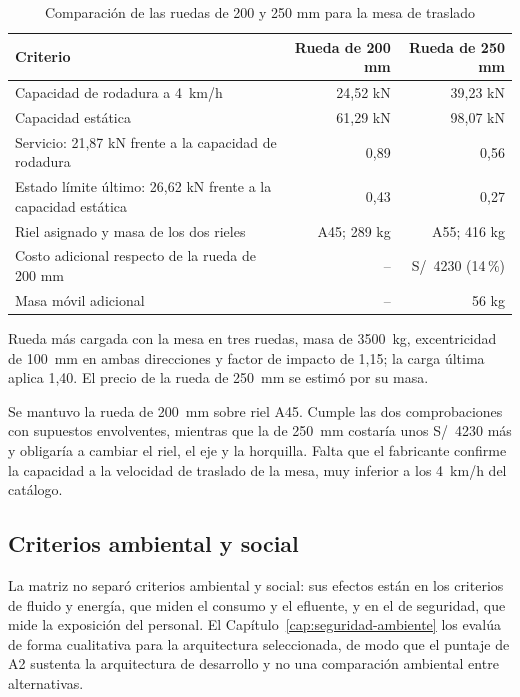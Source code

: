 \begin{table}[htbp]
\centering\small\singlespacing
\caption{Comparación de las ruedas de 200 y 250 mm para la mesa de traslado}
\label{tab:rueda-200-250}
\begin{tabularx}{\textwidth}{@{}Yrr@{}}
\toprule
\textbf{Criterio} & \textbf{Rueda de 200 mm} & \textbf{Rueda de 250 mm}\\
\midrule
Capacidad de rodadura a 4~km/h \cite{blickle2026} & 24,52 kN & 39,23 kN\\
Capacidad estática \cite{blickle2026} & 61,29 kN & 98,07 kN\\
Servicio: 21,87 kN frente a la capacidad de rodadura & 0,89 & 0,56\\
Estado límite último: 26,62 kN frente a la capacidad estática & 0,43 & 0,27\\
Riel asignado y masa de los dos rieles \cite{arcelor2023} & A45; 289 kg & A55; 416 kg\\
Costo adicional respecto de la rueda de 200 mm & -- & S/~4230 (14\,\%)\\
Masa móvil adicional & -- & 56 kg\\
\bottomrule
\end{tabularx}
\par\smallskip\footnotesize
Rueda más cargada con la mesa en tres ruedas, masa de 3500~kg, excentricidad de 100~mm en ambas direcciones y factor de impacto de 1,15; la carga última aplica 1,40. El precio de la rueda de 250~mm se estimó por su masa.
\end{table}

Se mantuvo la rueda de 200~mm sobre riel A45. Cumple las dos comprobaciones con supuestos envolventes, mientras que la de 250~mm costaría unos S/~4230 más y obligaría a cambiar el riel, el eje y la horquilla. Falta que el fabricante confirme la capacidad a la velocidad de traslado de la mesa, muy inferior a los 4~km/h del catálogo.

\subsection{Criterios ambiental y social}
\label{sec:matriz-ambiental-social}

La matriz no separó criterios ambiental y social: sus efectos están en los criterios de fluido y energía, que miden el consumo y el efluente, y en el de seguridad, que mide la exposición del personal. El Capítulo~\ref{cap:seguridad-ambiente} los evalúa de forma cualitativa para la arquitectura seleccionada, de modo que el puntaje de A2 sustenta la arquitectura de desarrollo y no una comparación ambiental entre alternativas.

